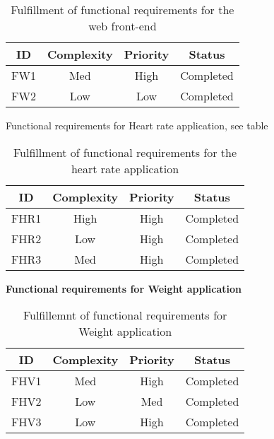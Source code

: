 \iffalse
\begin{table}[H]
\begin{center}
\begin{tabular}{ | c | c | c | c |}
  \hline
  \textbf{ID} & \textbf{Complexity} & \textbf{Priority} & \textbf{Status}\\
  \hline\noalign{\smallskip}\noalign{\smallskip}\hline
  FW1	& Med & High & Completed \\
  FW2	& Low & Low	 & Completed \\
  \hline
\end{tabular}
\end{center}
\caption{Fulfillment of functional requirements for the web front-end}
\label{table:reqfrontend}
\end{table}

Functional requirements for Heart rate application, see table

\begin{table}[H]
\begin{center}
\begin{tabular}{ | c | c | c | c |}
  \hline
  \textbf{ID} & \textbf{Complexity} & \textbf{Priority} & \textbf{Status}\\
  \hline\noalign{\smallskip}\hline
  FHR1	& High & High & Completed \\
  FHR2	& Low  & High & Completed \\
  FHR3	& Med  & High & Completed \\
  \hline
\end{tabular}
\end{center}
\caption{Fulfillment of functional requirements for the heart rate application}
\label{table:fulfillemntofapp}
\end{table}

\textbf{Functional requirements for Weight application}

\begin{table}[H]
\begin{center}
\begin{tabular}{ | c | c | c | c |}
  \hline
  \textbf{ID} & \textbf{Complexity} & \textbf{Priority} & \textbf{Status}\\
  \hline\noalign{\smallskip}\hline
  FHV1	& Med & High & Completed \\
  FHV2	& Low & Med  & Completed \\
  FHV3	& Low & High & Completed \\
  \hline
\end{tabular}
\end{center}
\caption{Fulfillemnt of functional requirements for Weight application}
\label{table:fulfillemntweightapp}
\end{table}

